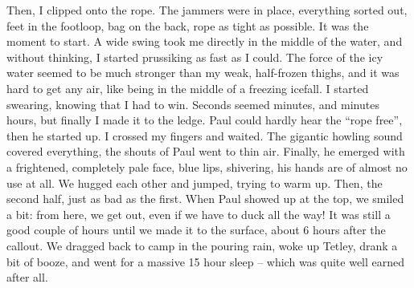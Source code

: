 Then, I clipped onto the rope. The jammers were in place, everything
sorted out, feet in the footloop, bag on the back, rope as tight as
possible. It was the moment to start. A wide swing took me directly in
the middle of the water, and without thinking, I started prussiking as
fast as I could. The force of the icy water seemed to be much stronger
than my weak, half-frozen thighs, and it was hard to get any air, like
being in the middle of a freezing icefall. I started swearing, knowing
that I had to win. Seconds seemed minutes, and minutes hours, but
finally I made it to the ledge. Paul could hardly hear the ``rope
free'', then he started up. I crossed my fingers and waited. The
gigantic howling sound covered everything, the shouts of Paul went to
thin air. Finally, he emerged with a frightened, completely pale face,
blue lips, shivering, his hands are of almost no use at all. We hugged
each other and jumped, trying to warm up. Then, the second half, just as
bad as the first. When Paul showed up at the top, we smiled a bit: from
here, we get out, even if we have to duck all the way! It was still a
good couple of hours until we made it to the surface, about 6 hours
after the callout. We dragged back to camp in the pouring rain, woke up
Tetley, drank a bit of booze, and went for a massive 15 hour sleep --
which was quite well earned after all.

